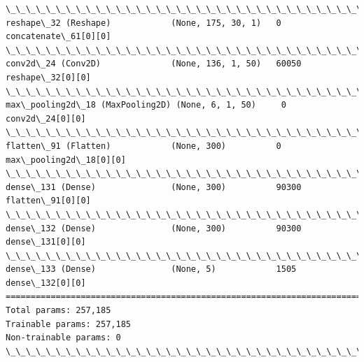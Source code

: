 \documentclass[11pt]{article}
\begin{document}
\begin{Verbatim}[commandchars=\\\{\}]
\_\_\_\_\_\_\_\_\_\_\_\_\_\_\_\_\_\_\_\_\_\_\_\_\_\_\_\_\_\_\_\_\_\_\_\_\_\_\_\_\_\_\_\_\_\_\_\_\_\_\_\_\_\_\_\_\_\_\_\_\_\_\_\_\_\_\_\_\_\_\_\_\_\_\_\_\_\_\_\_\_\_\_\_\_\_\_\_\_\_\_\_\_\_\_\_\_\_
reshape\_32 (Reshape)            (None, 175, 30, 1)   0           concatenate\_61[0][0]             
\_\_\_\_\_\_\_\_\_\_\_\_\_\_\_\_\_\_\_\_\_\_\_\_\_\_\_\_\_\_\_\_\_\_\_\_\_\_\_\_\_\_\_\_\_\_\_\_\_\_\_\_\_\_\_\_\_\_\_\_\_\_\_\_\_\_\_\_\_\_\_\_\_\_\_\_\_\_\_\_\_\_\_\_\_\_\_\_\_\_\_\_\_\_\_\_\_\_
conv2d\_24 (Conv2D)              (None, 136, 1, 50)   60050       reshape\_32[0][0]                 
\_\_\_\_\_\_\_\_\_\_\_\_\_\_\_\_\_\_\_\_\_\_\_\_\_\_\_\_\_\_\_\_\_\_\_\_\_\_\_\_\_\_\_\_\_\_\_\_\_\_\_\_\_\_\_\_\_\_\_\_\_\_\_\_\_\_\_\_\_\_\_\_\_\_\_\_\_\_\_\_\_\_\_\_\_\_\_\_\_\_\_\_\_\_\_\_\_\_
max\_pooling2d\_18 (MaxPooling2D) (None, 6, 1, 50)     0           conv2d\_24[0][0]                  
\_\_\_\_\_\_\_\_\_\_\_\_\_\_\_\_\_\_\_\_\_\_\_\_\_\_\_\_\_\_\_\_\_\_\_\_\_\_\_\_\_\_\_\_\_\_\_\_\_\_\_\_\_\_\_\_\_\_\_\_\_\_\_\_\_\_\_\_\_\_\_\_\_\_\_\_\_\_\_\_\_\_\_\_\_\_\_\_\_\_\_\_\_\_\_\_\_\_
flatten\_91 (Flatten)            (None, 300)          0           max\_pooling2d\_18[0][0]           
\_\_\_\_\_\_\_\_\_\_\_\_\_\_\_\_\_\_\_\_\_\_\_\_\_\_\_\_\_\_\_\_\_\_\_\_\_\_\_\_\_\_\_\_\_\_\_\_\_\_\_\_\_\_\_\_\_\_\_\_\_\_\_\_\_\_\_\_\_\_\_\_\_\_\_\_\_\_\_\_\_\_\_\_\_\_\_\_\_\_\_\_\_\_\_\_\_\_
dense\_131 (Dense)               (None, 300)          90300       flatten\_91[0][0]                 
\_\_\_\_\_\_\_\_\_\_\_\_\_\_\_\_\_\_\_\_\_\_\_\_\_\_\_\_\_\_\_\_\_\_\_\_\_\_\_\_\_\_\_\_\_\_\_\_\_\_\_\_\_\_\_\_\_\_\_\_\_\_\_\_\_\_\_\_\_\_\_\_\_\_\_\_\_\_\_\_\_\_\_\_\_\_\_\_\_\_\_\_\_\_\_\_\_\_
dense\_132 (Dense)               (None, 300)          90300       dense\_131[0][0]                  
\_\_\_\_\_\_\_\_\_\_\_\_\_\_\_\_\_\_\_\_\_\_\_\_\_\_\_\_\_\_\_\_\_\_\_\_\_\_\_\_\_\_\_\_\_\_\_\_\_\_\_\_\_\_\_\_\_\_\_\_\_\_\_\_\_\_\_\_\_\_\_\_\_\_\_\_\_\_\_\_\_\_\_\_\_\_\_\_\_\_\_\_\_\_\_\_\_\_
dense\_133 (Dense)               (None, 5)            1505        dense\_132[0][0]                  
==================================================================================================
Total params: 257,185
Trainable params: 257,185
Non-trainable params: 0
\_\_\_\_\_\_\_\_\_\_\_\_\_\_\_\_\_\_\_\_\_\_\_\_\_\_\_\_\_\_\_\_\_\_\_\_\_\_\_\_\_\_\_\_\_\_\_\_\_\_\_\_\_\_\_\_\_\_\_\_\_\_\_\_\_\_\_\_\_\_\_\_\_\_\_\_\_\_\_\_\_\_\_\_\_\_\_\_\_\_\_\_\_\_\_\_\_\_

    \end{Verbatim}

    \begin{center}
    \end{center}
    { \hspace*{\fill} \\}
    
\end{document}
